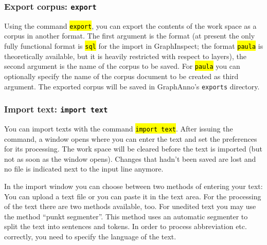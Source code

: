 \documentclass[12pt]{scrartcl}
\newcommand{\code}[1]{\hl{\texttt{#1}}}
\begin{document}
\subsubsection{Export corpus: \texttt{export}}\label{befehl-export}

Using the command \code{export}, you can export the contents of the work space as a corpus in another format.
The first argument is the format (at present the only fully functional format is \code{sql} for the import in GraphInspect; the format \code{paula} is theoretically available, but it is heavily restricted with respect to layers), the second argument is the name of the corpus to be saved.
For \code{paula} you can optionally specify the name of the corpus document to be created as third argument.
The exported corpus will be saved in GraphAnno’s \texttt{exports} directory.


\subsubsection{Import text: \texttt{import text}}

You can import texts with the command \code{import text}. After issuing the command, a window opens where you can enter the text and set the preferences for its processing.
The work space will be cleared before the text is imported (but not as soon as the window opens).
Changes that hadn’t been saved are lost and no file is indicated next to the input line anymore.

In the import window you can choose between two methods of entering your text:
You can upload a text file or you can paste it in the text area.
For the processing of the text there are two methods available, too.
For unedited text you may use the method “punkt segmenter”.
This method uses an automatic segmenter to split the text into sentences and tokens.
In order to process abbreviation etc. correctly, you need to specify the language of the text.
\end{document}
